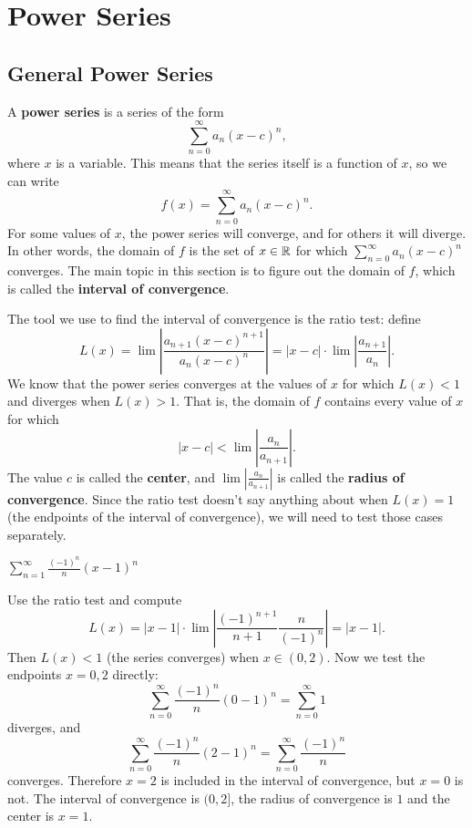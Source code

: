 \section{Power Series}
\label{sec:power-series}


\subsection{General Power Series}

A \textbf{power series} is a series of the form
$$\sum_{n=0}^\infty a_n(x-c)^n,$$
where $x$ is a variable. This means that the series itself is a function of $x$, so we can write 
$$f(x)=\sum_{n=0}^\infty a_n(x-c)^n.$$
For some values of $x$, the power series will converge, and for others it will diverge. In other words, the domain of $f$ is the set of $x\in\mathbb{R}$ for which $\sum_{n=0}^\infty a_n(x-c)^n$ converges. The main topic in this section is to figure out the domain of $f$, which is called the \textbf{interval of convergence}.

The tool we use to find the interval of convergence is the ratio test: define
$$L(x)=\lim \left|\frac{a_{n+1}(x-c)^{n+1}}{a_{n}(x-c)^n}\right|=|x-c|\cdot\lim \left|\frac{a_{n+1}}{a_{n}}\right|.$$
We know that the power series converges at the values of $x$ for which $L(x) < 1$ and diverges when $L(x) > 1$. That is, the domain of $f$ contains every value of $x$ for which
$$|x-c|<\lim\left|\frac{a_{n}}{a_{n+1}}\right|.$$
The value $c$ is called the \textbf{center}, and $\lim\left|\frac{a_{n}}{a_{n+1}}\right|$ is called the \textbf{radius of convergence}. Since the ratio test doesn't say anything about when $L(x)=1$ (the endpoints of the interval of convergence), we will need to test those cases separately.
\begin{exampleblock}
$\displaystyle\sum_{n=1}^\infty \frac{(-1)^n}{n}(x-1)^n$

Use the ratio test and compute
$$L(x)=|x-1|\cdot\lim\left|\frac{(-1)^{n+1}}{n+1}\frac{n}{(-1)^n}\right|=|x-1|.$$
Then $L(x)<1$ (the series converges) when $x\in (0, 2)$. Now we test the endpoints $x=0,2$ directly:
$$\sum_{n=0}^\infty \frac{(-1)^n}{n}(0-1)^n=\sum_{n=0}^\infty1$$
diverges, and
$$\sum_{n=0}^\infty \frac{(-1)^n}{n}(2-1)^n=\sum_{n=0}^\infty \frac{(-1)^n}{n}$$
converges. Therefore $x=2$ is included in the interval of convergence, but $x=0$ is not. The interval of convergence is $(0,2]$, the radius of convergence is $1$ and the center is $x=1$.
\end{exampleblock}

